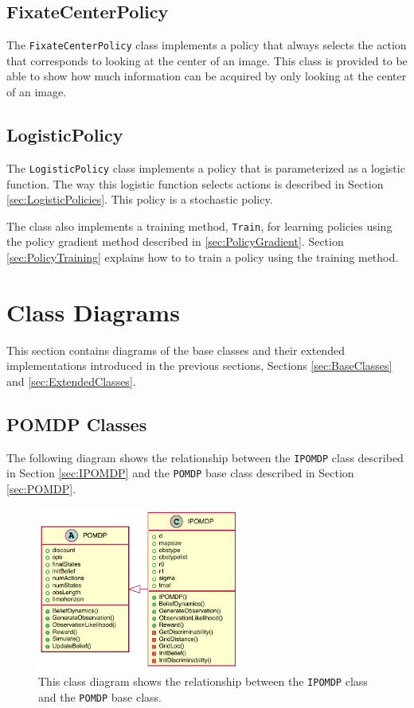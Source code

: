 \subsection{FixateCenterPolicy}
\label{sec:FixateCenterPolicy}
The \texttt{FixateCenterPolicy} class implements a policy that always selects the action that corresponds to looking at the center of an image. This class is provided to be able to show how much information can be acquired by only looking at the center of an image.

\subsection{LogisticPolicy}
\label{sec:LogisticPolicy}
The \texttt{LogisticPolicy} class implements a policy that is parameterized as a logistic function. The way this logistic function selects actions is described in Section \ref{sec:LogisticPolicies}. This policy is a stochastic policy.

The class also implements a training method, \texttt{Train}, for learning policies using the policy gradient method described in \ref{sec:PolicyGradient}. Section \ref{sec:PolicyTraining} explains how to to train a policy using the training method.

\section{Class Diagrams}
This section contains diagrams of the base classes and their extended implementations introduced in the previous sections, Sections \ref{sec:BaseClasses} and \ref{sec:ExtendedClasses}.

\subsection{POMDP Classes}
The following diagram shows the relationship between the \texttt{IPOMDP} class described in Section \ref{sec:IPOMDP} and the \texttt{POMDP} base class described in Section \ref{sec:POMDP}.

\begin{figure}[tb]
  \centering
  \includegraphics[width=0.6\textwidth]{figures/POMDPClasses}
  \caption{This class diagram shows the relationship between the \texttt{IPOMDP} class and the \texttt{POMDP} base class.}
  \label{fig:POMDPClasses}
\end{figure}

